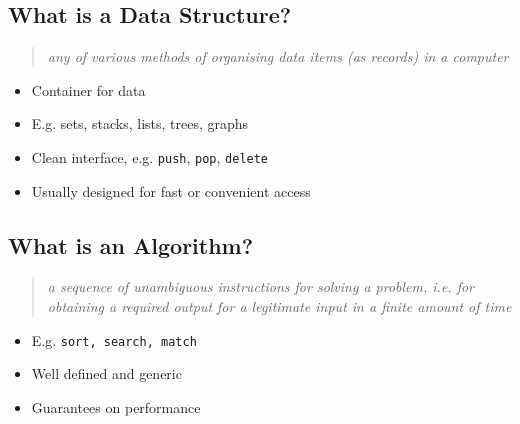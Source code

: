 
\begin{slide}
\section{What is a Data Structure?}

\begin{PauseHighLight}
  \begin{quote}\it
    any of various methods of organising data items (as records) in a computer
  \end{quote}\pause
  \begin{itemize}
  \item Container for data\pause
  \item E.g. sets, stacks, lists, trees, graphs\pause
  \item Clean interface, e.g. \texttt{push}, \texttt{pop},
    \texttt{delete}\pause
  \item Usually designed for fast or convenient access \pause
\end{itemize}
\end{PauseHighLight}
\end{slide}



\begin{slide}
\section{What is an Algorithm?}

\begin{PauseHighLight}
  \begin{quote}\it
    a sequence of unambiguous instructions for solving a problem,
    i.e. for obtaining a required output for a legitimate input in a
    finite amount of time
  \end{quote}\pause
  \begin{itemize}
  \item E.g. \texttt{sort, search, match}\pause
  \item Well defined and generic\pause
  \item Guarantees on performance\pause
  \end{itemize}
\end{PauseHighLight}
\end{slide}


